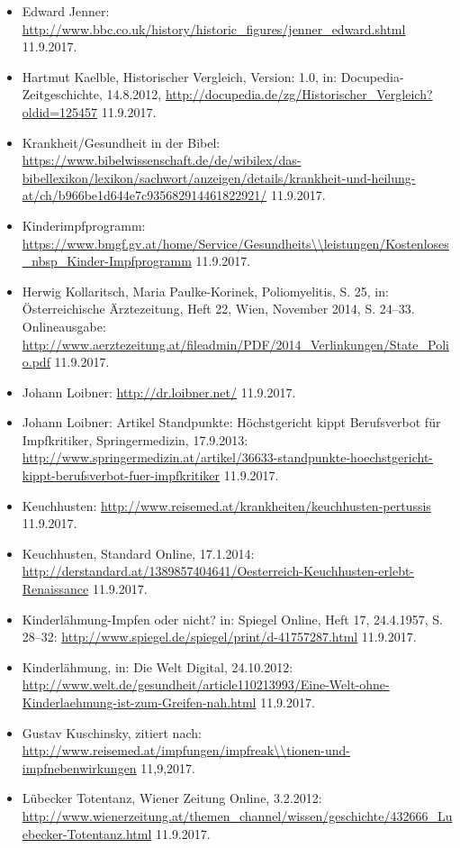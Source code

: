 \documentclass[
    a4paper,
    12pt,
    hyphens,
    chapterprefix=true,
    headheight=33pt,
    footheight=29pt,
    headings=optiontohead,
]{scrartcl}
\begin{document}
{\begin{itemize}
\item{Edward Jenner: \url{http://www.bbc.co.uk/history/historic_figures/jenner_edward.shtml} 11.9.2017.}
\item{Hartmut Kaelble, Historischer Vergleich, Version: 1.0, in: Docupedia-Zeitgeschichte, 14.8.2012, \url{http://docupedia.de/zg/Historischer_Vergleich?oldid=125457} 11.9.2017.}
\item{Krankheit/Gesundheit in der Bibel: \url{https://www.bibelwissenschaft.de/de/wibilex/das-bibellexikon/lexikon/sachwort/anzeigen/details/krankheit-und-heilung-at/ch/b966be1d644e7c935682914461822921/} 11.9.2017.}
\item{Kinderimpfprogramm: \url{https://www.bmgf.gv.at/home/Service/Gesundheits\\leistungen/Kostenloses_nbsp_Kinder-Impfprogramm} 11.9.2017.}
\item{Herwig Kollaritsch, Maria Paulke-Korinek, Poliomyelitis, S. 25, in: Österreichische Ärztezeitung, Heft 22, Wien, November 2014, S. 24--33. Onlineausgabe: \url{http://www.aerztezeitung.at/fileadmin/PDF/2014_Verlinkungen/State_Polio.pdf} 11.9.2017.}
\item{Johann Loibner: \url{http://dr.loibner.net/} 11.9.2017.}
\item{Johann Loibner: Artikel Standpunkte: Höchstgericht kippt Berufsverbot für Impfkritiker, Springermedizin, 17.9.2013: \url{http://www.springermedizin.at/artikel/36633-standpunkte-hoechstgericht-kippt-berufsverbot-fuer-impfkritiker} 11.9.2017.}
\item{Keuchhusten: \url{http://www.reisemed.at/krankheiten/keuchhusten-pertussis} 11.9.2017.}
\item{Keuchhusten, Standard Online, 17.1.2014: \url{http://derstandard.at/1389857404641/Oesterreich-Keuchhusten-erlebt-Renaissance} 11.9.2017.}
\item{Kinderlähmung-Impfen oder nicht? in: Spiegel Online, Heft 17, 24.4.1957, S. 28--32: \url{http://www.spiegel.de/spiegel/print/d-41757287.html} 11.9.2017.}
\item{Kinderlähmung, in: Die Welt Digital, 24.10.2012: \url{http://www.welt.de/gesundheit/article110213993/Eine-Welt-ohne-Kinderlaehmung-ist-zum-Greifen-nah.html} 11.9.2017.}
\item{Gustav Kuschinsky, zitiert nach: \url{http://www.reisemed.at/impfungen/impfreak\\tionen-und-impfnebenwirkungen} 11,9,2017.}
\item{Lübecker Totentanz, Wiener Zeitung Online, 3.2.2012: \url{http://www.wienerzeitung.at/themen_channel/wissen/geschichte/432666_Luebecker-Totentanz.html} 11.9.2017.}

\end{itemize}}
\end{document}
